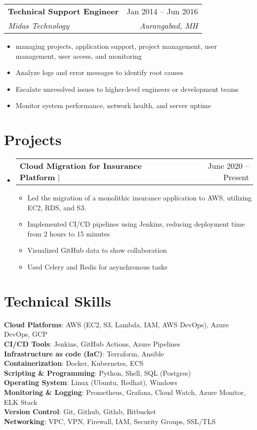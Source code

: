 \documentclass[letterpaper,11pt]{article}
\makeatletter
\newcommand{\resumeItem}[1]{
  \item\small{
    {#1 \vspace{-2pt}}
  }
}
\newcommand{\resumeSubheading}[4]{
  \vspace{-2pt}\item
    \begin{tabular*}{0.97\textwidth}[t]{l@{\extracolsep{\fill}}r}
      \textbf{#1} & #2 \\
      \textit{\small#3} & \textit{\small #4} \\
    \end{tabular*}\vspace{-7pt}
}
\newcommand{\resumeProjectHeading}[2]{
    \item
    \begin{tabular*}{0.97\textwidth}{l@{\extracolsep{\fill}}r}
      \small#1 & #2 \\
    \end{tabular*}\vspace{-7pt}
}
\newcommand{\resumeSubHeadingListStart}{\begin{itemize}[leftmargin=0.15in, label={}]}
\newcommand{\resumeSubHeadingListEnd}{\end{itemize}}
\newcommand{\resumeItemListStart}{\begin{itemize}}
\newcommand{\resumeItemListEnd}{\end{itemize}\vspace{-5pt}}
\makeatother
\begin{document}
      \resumeSubheading
      {Technical Support Engineer}{Jan 2014 -- Jun 2016}
      {Midas Technology}{Aurangabad, MH}
      \resumeItemListStart
        \resumeItem{managing projects, application support, project management, user management, user access, and monitoring}
        \resumeItem{Analyze logs and error messages to identify root causes}
        \resumeItem{Escalate unresolved issues to higher-level engineers or development teams}
        \resumeItem{Monitor system performance, network health, and server uptime}
  \resumeSubHeadingListEnd


\section{Projects}
    \resumeSubHeadingListStart
      \resumeProjectHeading
          {\textbf{Cloud Migration for Insurance Platform} $|$ \emph}{June 2020 -- Present}
          \resumeItemListStart
            \resumeItem{Led the migration of a monolithic insurance application to AWS, utilizing EC2, RDS, and S3.}
            \resumeItem{Implemented CI/CD pipelines using Jenkins, reducing deployment time from 2 hours to 15 minutes}
            \resumeItem{Visualized GitHub data to show collaboration}
            \resumeItem{Used Celery and Redis for asynchronous tasks}
          \resumeItemListEnd

    \resumeSubHeadingListEnd



%
\section{Technical Skills}
 \begin{itemize}[leftmargin=0.15in, label={}]
    \small{\item{
     \textbf{Cloud Platforms}{: AWS (EC2, S3, Lambda, IAM, AWS DevOps), Azure DevOps, GCP} \\
     \textbf{CI/CD Tools}{: Jenkins, GitHub Actions, Azure Pipelines} \\
     \textbf{Infrastructure as code (IaC)}{: Terraform, Ansible} \\
     \textbf{{Containerization}}{: Docker, Kubernetes, ECS} \\
     \textbf{Scripting \& Programming}{: Python, Shell, SQL (Postgres)} \\
     \textbf{Operating System}{: Linux (Ubuntu, Redhat), Windows} \\
     \textbf{Monitoring \& Logging}{: Prometheus, Grafana, Cloud Watch, Azure Monitor, ELK Stack} \\
     \textbf{Version Control}{: Git, Github, Gitlab, Bitbucket} \\
     \textbf{{Networking}}{: VPC, VPN, Firewall, IAM, Security Groups, SSL/TLS} \\
    }}
 \end{itemize}


\end{document}
